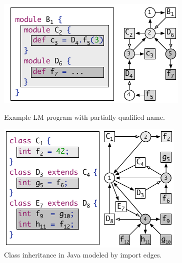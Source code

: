 \begin{figure}[t]
\begin{minipage}[b]{0.49\textwidth}
\begin{boxedminipage}{\hsize}
\hspace*{-0.3cm}
\includegraphics{figures/scope-graphs/qualified/example3.pdf}
\end{boxedminipage}
\caption{Example LM program with partially-qualified name.}
\end{minipage}
\begin{minipage}[b]{0.49\textwidth}
\begin{boxedminipage}{\hsize}
\hspace*{-1.5mm}
\includegraphics{figures/scope-graphs/inheritance/inheritance.pdf}
\end{boxedminipage}
\caption{Class inheritance in Java modeled by import edges.}
\end{minipage}
\end{figure}




